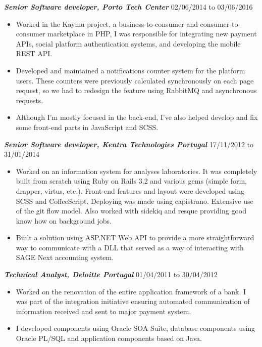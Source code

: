 \documentclass[line,margin]{resume}
\begin{document}
\begin{resume}
    {\sl\bf Senior Software developer, Porto Tech Center} \hfill 02/06/2014 to 03/06/2016
    \begin{itemize}
        \item Worked in the Kaymu project, a business-to-consumer and consumer-to-consumer marketplace in PHP, I was responsible for integrating new payment APIs, social platform authentication systems, and developing the mobile REST API.
        \item Developed and maintained a notifications counter system for the platform users. These counters were previously calculated synchronously on each page request, so we had to redesign the feature using RabbitMQ and asynchronous requests.
        \item Although I'm mostly focused in the back-end, I've also helped develop and fix some front-end parts in JavaScript and SCSS.
    \end{itemize}
    {\sl\bf Senior Software developer, Kentra Technologies Portugal} \hfill 17/11/2012 to 31/01/2014
    \begin{itemize}
        \item Worked on an information system for analyses laboratories. It was completely built from scratch using Ruby on Rails 3.2 and various gems (simple form, drapper, virtus, etc.). Front-end features and layout were developed using SCSS and CoffeeScript. Deploying was made using capistrano. Extensive use of the git flow model. Also worked with sidekiq and resque providing good know how on background jobs.
        \item Built a solution using ASP.NET Web API to provide a more straightforward way to communicate with a DLL that served as a way of interacting with SAGE Next accounting system.
    \end{itemize}

    {\sl\bf Technical Analyst, Deloitte Portugal} \hfill 01/04/2011 to 30/04/2012
    \begin{itemize}
        \item Worked on the renovation of the entire application framework of a bank. I was part of the integration initiative ensuring automated communication of information received and sent to major payment system.
        \item I developed components using Oracle SOA Suite, database components using Oracle PL/SQL and application components based on Java.
    \end{itemize}


\end{resume}
\end{document}
